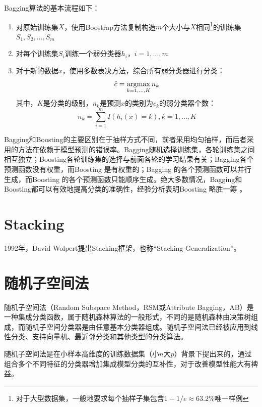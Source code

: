 Bagging算法的基本流程如下：
\begin{enumerate}
  \item 对原始训练集$X$，使用Boostrap方法复制构造$m$个大小与$X$相同\footnote{对于大型数据集，一般地要求每个抽样子集包含$1-1/e\approx 63.2\%$唯一样例}的训练集$S_1,S_2,\ldots,S_m$
  \item 对每个训练集$S_i$训练一个弱分类器$h_i$，$i=1,\ldots,m$
  \item 对于新的数据$x$，使用多数表决方法，综合所有弱分类器进行分类：
  \begin{equation}\label{eq:majorityvoting}
    \hat c = \operatorname*{\mathrm{\arg\!\max}}_{k=1,\ldots,K} n_k
  \end{equation}
  其中，$K$是分类的级别，$n_k$是预测$x$的类别为$c_k$的弱分类器个数：
  \begin{equation}
    n_k = \sum_{i=1}^m I(h_i(x) = k), k = 1,\ldots,K
  \end{equation}
\end{enumerate}

\begin{remark}
Bagging和Boosting的主要区别在于抽样方式不同，前者采用均匀抽样，而后者采用的方法在依赖于模型预测的错误率。Bagging随机选择训练集，各轮训练集之间相互独立；Boosting各轮训练集的选择与前面各轮的学习结果有关；Bagging各个预测函数没有权重，而Boosting 是有权重的；Bagging 的各个预测函数可以并行生成，而Boosting 的各个预测函数只能顺序生成。绝大多数情况，Bagging和Boosting都可以有效地提高分类的准确性，经验分析表明Boosting 略胜一筹
\cite{opitz1999popular}。
\end{remark}

\section{Stacking}
1992年，David Wolpert\cite{wolpert1992stacked}提出Stacking框架，也称“Stacking Generalization”。

\section{随机子空间法}
随机子空间法（Random Subspace Method，RSM或Attribute Bagging，AB）\cite{ho1998random,bryll2003attribute}是一种集成分类函数，属于随机森林算法的一般形式，不同的是随机森林由决策树组成，而随机子空间分类器是由任意基本分类器组成。随机子空间法已经被应用到线性分类、支持向量机、最近邻分类和其他类型的分类算法。

随机子空间法是在小样本高维度的训练数据集（小$n$大$p$）背景下提出来的，通过组合多个不同特征的分类器增加集成模型分类的互补性，对于改善模型性能大有裨益。

